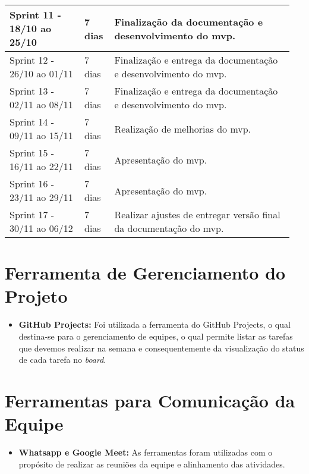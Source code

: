 \begin{quadro}[H]
\begin{tabular}{|p{0.25\linewidth} | p{0.10\linewidth} | p{0.60\linewidth} |}
        \\
        \hline
        Sprint 11 - 18/10 ao 25/10 & 7 dias & Finalização da documentação e desenvolvimento do \ac{mvp}. 
        \\
        \hline
        Sprint 12 - 26/10 ao 01/11 & 7 dias & Finalização e entrega da documentação e desenvolvimento do \ac{mvp}. 
        \\
        \hline
        Sprint 13 - 02/11 ao 08/11 & 7 dias & Finalização e entrega da documentação e desenvolvimento do \ac{mvp}. 
        \\
        \hline
        Sprint 14 - 09/11 ao 15/11 & 7 dias & Realização de melhorias do \ac{mvp}. 
        \\
        \hline
        Sprint 15 - 16/11 ao 22/11 & 7 dias & Apresentação do \ac{mvp}. 
        \\
        \hline
        Sprint 16 - 23/11 ao 29/11 & 7 dias & Apresentação do \ac{mvp}. 
        \\
        \hline
        Sprint 17 - 30/11 ao 06/12 & 7 dias & Realizar ajustes de entregar versão final da documentação  do \ac{mvp}. 
        \\
        
        
        \hline
        \end{tabular}
\end{quadro}

\section{Ferramenta de Gerenciamento do Projeto}
\begin{itemize}
    \item \textbf{GitHub Projects:} Foi utilizada a ferramenta do GitHub Projects, o qual destina-se para o gerenciamento de equipes, o qual permite listar as tarefas que devemos realizar na semana e consequentemente da visualização do status de cada tarefa no \emph{\gls{board}}.
\end{itemize}

\section{Ferramentas para Comunicação da Equipe}
\begin{itemize}

    \item \textbf{Whatsapp e Google Meet:} As ferramentas foram utilizadas com o propósito de realizar as reuniões da equipe e alinhamento das atividades.
\end{itemize}